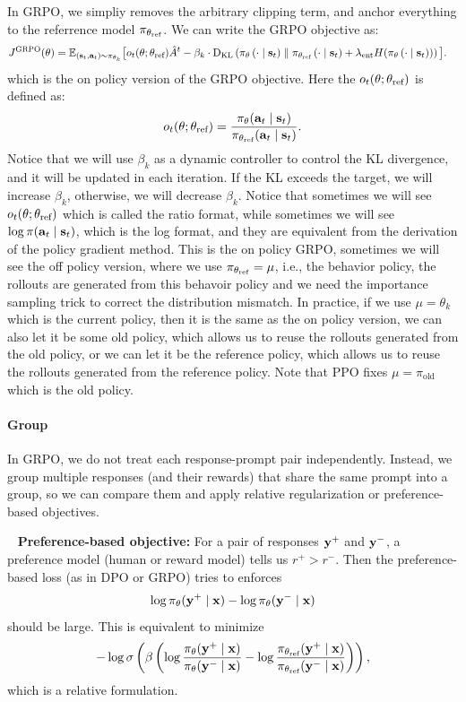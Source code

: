 \documentclass[11pt]{article}  %
\begin{document}
In GRPO, we simpliy removes the arbitrary clipping term, and anchor everything to the referrence model $\pi_{\theta_{\text{ref}}}$.
We can write the GRPO objective as:
\begin{align*}
  J^{\text{GRPO}}(\theta) &= \mathbb{E}_{\substack{(\mathbf{s}_t, \mathbf{a}_t) \sim \pi_{\theta_k}}}\big[o_t(\theta; \theta_{\text{ref}}) \hat{A}^t - \beta_k \cdot {\rm D}_{\text{KL}}\left( \pi_{\theta}\left( \cdot \mid \mathbf{s}_t \right) \parallel \pi_{\theta_{\text{ref}}}\left( \cdot \mid \mathbf{s}_t \right) + \lambda_{\text{ent}} H(\pi_{\theta}\left( \cdot \mid \mathbf{s}_t \right)) \right)\big].
\end{align*}
which is the on policy version of the GRPO objective.
Here the $o_t(\theta; \theta_{\text{ref}})$ is defined as:
\begin{align*}
  o_t(\theta; \theta_{\text{ref}}) = \frac{\pi_{\theta}(\mathbf{a}_t \mid \mathbf{s}_t)}{\pi_{\theta_{\text{ref}}}(\mathbf{a}_t \mid \mathbf{s}_t)}.
\end{align*}
Notice that we will use $\beta_k$ as a dynamic controller to control the KL divergence, and it will be updated in each iteration.
If the KL exceeds the target, we will increase $\beta_k$, otherwise, we will decrease $\beta_k$.
Notice that sometimes we will see $o_t(\theta; \theta_{\text{ref}})$ which is called the ratio format, while sometimes we will see $\log \pi(\mathbf{a}_t \mid \mathbf{s}_t)$, which is the log format, and they are equivalent from the derivation of the policy gradient method.
This is the on policy GRPO, sometimes we will see the off policy version, where we use $\pi_{\theta_{\text{ref}}} = \mu$, i.e., the behavior policy, the rollouts are generated from this behavoir policy and we need the importance sampling trick to correct the distribution mismatch.
In practice, if we use $\mu = \theta_k$ which is the current policy, then it is the same as the on policy version, we can also let it be some old policy, which allows us to reuse the rollouts generated from the old policy, or we can let it be the reference policy, which allows us to reuse the rollouts generated from the reference policy.
Note that PPO fixes $\mu = \pi_{\text{old}}$ which is the old policy.


\paragraph{Group}
In GRPO, we do not treat each response-prompt pair independently.
Instead, we group multiple responses (and their rewards) that share the same prompt into a group, so we can compare them and apply relative regularization or preference-based objectives.

\textbullet~ \textbf{Preference-based objective:} For a pair of responses $\mathbf{y}^{+}$ and $\mathbf{y}^{-}$, a preference model (human or reward model) tells us $r^+ > r^-$.
Then the preference-based loss (as in DPO or GRPO) tries to enforces
\begin{align*}
  \log \pi_\theta(\mathbf{y}^+ \mid \mathbf{x}) - \log \pi_\theta(\mathbf{y}^- \mid \mathbf{x}) 
\end{align*} 
should be large.
This is equivalent to minimize 
\begin{align*}
  -\log \sigma \left( \beta\left( \log\frac{\pi_\theta(\mathbf{y}^+\mid\mathbf{x})}{\pi_{\theta}(\mathbf{y}^- \mid\mathbf{x})} - \log\frac{\pi_{\theta_{\text{ref}}}(\mathbf{y}^+\mid\mathbf{x})}{\pi_{\theta_{\text{ref}}}(\mathbf{y}^- \mid\mathbf{x})} \right) \right),
\end{align*}
which is a relative formulation.
\end{document}
